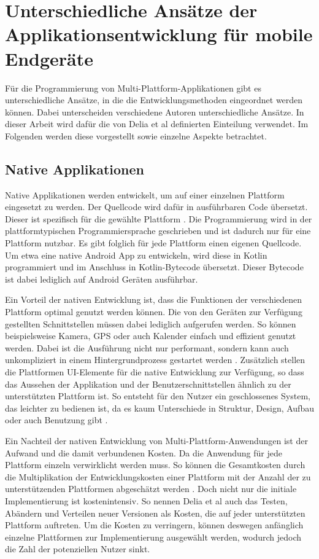 \section{Unterschiedliche Ansätze der Applikationsentwicklung für mobile Endgeräte}
\label{cha:3_2}
Für die Programmierung von Multi-Plattform-Applikationen gibt es unterschiedliche Ansätze, in die die Entwicklungsmethoden eingeordnet werden können. Dabei unterscheiden verschiedene Autoren unterschiedliche Ansätze. In dieser Arbeit wird dafür die von Delia et al \cite{IEEE_development_classes} definierten Einteilung verwendet. Im Folgenden werden diese vorgestellt sowie einzelne Aspekte betrachtet.

\subsection{Native Applikationen}
Native Applikationen werden entwickelt, um auf einer einzelnen Plattform eingesetzt zu werden. Der Quellcode wird dafür in ausführbaren Code übersetzt. Dieser ist spezifisch für die gewählte Plattform \cite{IEEE_development_classes}.
Die Programmierung wird in der plattformtypischen Programmiersprache geschrieben und ist dadurch nur für eine Plattform nutzbar. Es gibt folglich für jede Plattform einen eigenen Quellcode. Um etwa eine native Android App zu entwickeln, wird diese in Kotlin programmiert und im Anschluss in Kotlin-Bytecode übersetzt. Dieser Bytecode ist dabei lediglich auf Android Geräten ausführbar.

Ein Vorteil der nativen Entwicklung ist, dass die Funktionen der verschiedenen Plattform optimal genutzt werden können. Die von den Geräten zur Verfügung gestellten Schnittstellen müssen dabei lediglich aufgerufen werden. So können beispielsweise Kamera, GPS oder auch Kalender einfach und effizient genutzt werden. Dabei ist die Ausführung nicht nur performant, sondern kann auch unkompliziert in einem Hintergrundprozess gestartet werden \cite{IEEE_development_classes}.
Zusätzlich stellen die Plattformen UI-Elemente für die native Entwicklung zur Verfügung, so dass das Aussehen der Applikation und der Benutzerschnittstellen ähnlich zu der unterstützten Plattform ist. So entsteht für den Nutzer ein geschlossenes System, das leichter zu bedienen ist, da es kaum Unterschiede in Struktur, Design, Aufbau oder auch Benutzung gibt \cite{IEEE_Khackouch_Al}.

Ein Nachteil der nativen Entwicklung von Multi-Plattform-Anwendungen ist der Aufwand und die damit verbundenen Kosten. Da die Anwendung für jede Plattform einzeln verwirklicht werden muss. So können die Gesamtkosten durch die Multiplikation der Entwicklungskosten einer Plattform mit der Anzahl der zu unterstützenden Plattformen abgeschätzt werden \cite{IEEE_Khackouch_Al}. Doch nicht nur die initiale Implementierung ist kostenintensiv. So nennen Delia et al \cite{IEEE_development_classes} auch das Testen, Abändern und Verteilen neuer Versionen als Kosten, die auf jeder unterstützten Plattform auftreten. 
Um die Kosten zu verringern, können deswegen anfänglich einzelne Plattformen zur Implementierung ausgewählt werden, wodurch jedoch die Zahl der potenziellen Nutzer sinkt.

